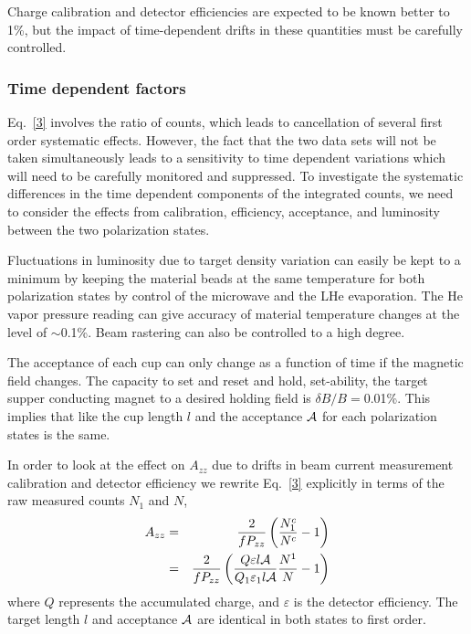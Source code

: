 
Charge calibration and detector efficiencies are expected to be known better to 1\%, but the impact of time-dependent drifts in these quantities must be carefully controlled.

\subsubsection*{Time dependent factors}
Eq.~\ref{3} involves the ratio of counts, which leads to cancellation of several first order systematic effects.  However, the fact that the two data sets will not be taken simultaneously leads to a sensitivity to time dependent variations which will need to be carefully monitored and suppressed.
%
To investigate the systematic differences in the time dependent components of the
integrated counts, we need to consider the effects from calibration, efficiency, acceptance,
and luminosity between the two polarization states.

Fluctuations in luminosity due to target density variation can easily be kept to a
minimum by keeping the material beads at the same temperature for both polarization
states by control of the microwave and the LHe evaporation.  The He vapor pressure reading
can give accuracy of material temperature changes at the level of $\sim$0.1\%.
Beam rastering can also be controlled to a high degree. 

The acceptance of each cup can only change as a function of time if the magnetic field
changes.  The capacity to set and reset and hold, set-ability, the target supper conducting magnet
to a desired holding field is $\delta B /B=$0.01\%.  This implies that like the cup length $l$ and the
acceptance ${\cal A}$ for each polarization states is the same.

In order to look at the effect on $A_{zz}$ due to drifts in beam current measurement
calibration and detector efficiency 
we rewrite Eq.~\ref{3} explicitly in terms of the raw measured counts $N_1$ and $N$,
\begin{eqnarray} \label{3c}
\nonumber
A_{zz}&=&\frac{2}{fP_{zz}}\left(\frac{N^c_1}{N^c}-1\right) \\
      &=&\frac{2}{fP_{zz}}\left(\frac{Q\varepsilon l \cal{A}}{Q_1\varepsilon_1 l \cal{A}}\frac{N^1}{N}-1\right)
\end{eqnarray}
where $Q$ represents the accumulated charge, and $\varepsilon$ is the detector efficiency. The target length $l$  and acceptance $\cal{A}$ are identical in both states to first order.

